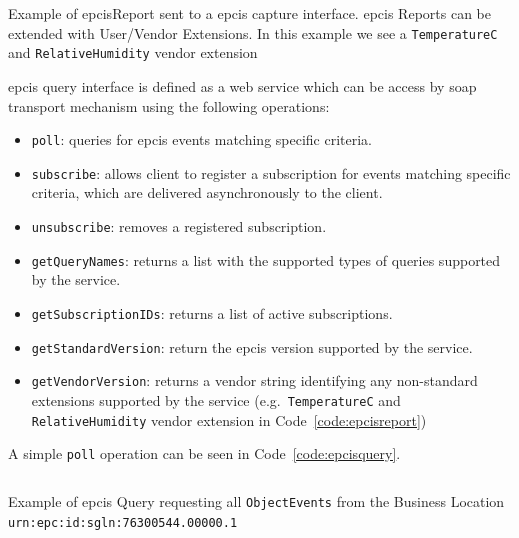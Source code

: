 \begin{listing}
    \inputminted[linenos, breaklines]{xml}{./code/sota/EPCIS_query_response.xml}
    \caption{Example of \ac{epcis}Report sent to a \ac{epcis} capture interface. \ac{epcis} Reports can be extended with User/Vendor Extensions. In this example we see a \texttt{TemperatureC} and \texttt{RelativeHumidity} vendor extension}
    \label{code:epcisreport}
\end{listing}

\ac{epcis} query interface is defined as a web service which can be access by \ac{soap} transport mechanism using the following operations: 

\begin{itemize}
    \item \texttt{poll}: queries for \ac{epcis} events matching specific criteria.
    \item \texttt{subscribe}: allows client to register a subscription for events matching specific criteria, which are delivered asynchronously to the client. 
    \item \texttt{unsubscribe}: removes a registered subscription.
    \item \texttt{getQueryNames}: returns a list with the supported types of queries supported by the service.
    \item \texttt{getSubscriptionIDs}: returns a list of active subscriptions.
    \item \texttt{getStandardVersion}: return the \ac{epcis} version supported by the service.
    \item \texttt{getVendorVersion}: returns a vendor string identifying any non-standard extensions supported by the service (e.g.\ \texttt{TemperatureC} and \texttt{RelativeHumidity} vendor extension in Code~\ref{code:epcisreport})
\end{itemize}

A simple \texttt{poll} operation can be seen in Code~\ref{code:epcisquery}.

\begin{listing}
    \inputminted[linenos, breaklines]{xml}{./code/sota/EPCIS_query.xml}
    \caption{Example of \ac{epcis} Query requesting all \texttt{ObjectEvents} from the Business Location \texttt{urn:epc:id:sgln:76300544.00000.1}}
    \label{code:epcisquery}
\end{listing}

\cleardoublepage
